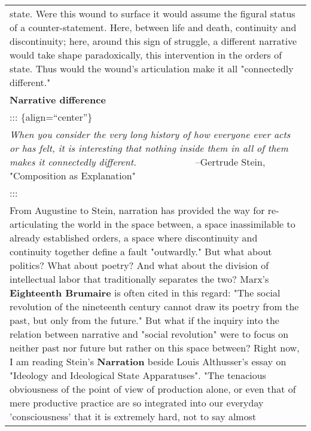 \begin{longtable}[]{@{}l@{}}
\begin{minipage}[t]{0.97\columnwidth}
state. Were this wound to surface it would assume the figural status of
a counter-statement. Here, between life and death, continuity and
discontinuity; here, around this sign of struggle, a different narrative
would take shape paradoxically, this intervention in the orders of
state. Thus would the wound's articulation make it all "connectedly
different."\strut
\end{minipage}\tabularnewline
\begin{minipage}[t]{0.97\columnwidth}\raggedright
\textbf{Narrative difference}\strut
\end{minipage}\tabularnewline
\begin{minipage}[t]{0.97\columnwidth}\raggedright
::: \{align=``center''\}\strut
\end{minipage}\tabularnewline
\begin{minipage}[t]{0.97\columnwidth}\raggedright
\textbar{} \emph{When you consider the very long history of how everyone
ever acts or \textbar{} has \textbar{} felt, it is interesting that
nothing inside them in all of them makes \textbar{} it \textbar{}
connectedly different.} \textbar{} \textbar{} ~~~~~~~~~~ ~--Gertrude
Stein, "Composition as Explanation"\strut
\end{minipage}\tabularnewline
\begin{minipage}[t]{0.97\columnwidth}\raggedright
:::\strut
\end{minipage}\tabularnewline
\begin{minipage}[t]{0.97\columnwidth}\raggedright
From Augustine to Stein, narration has provided the way for
re-articulating the world in the space between, a space inassimilable to
already established orders, a space where discontinuity and continuity
together define a fault "outwardly." But what about politics? What about
poetry? And what about the division of intellectual labor that
traditionally separates the two? Marx's \textbf{Eighteenth Brumaire} is
often cited in this regard: "The social revolution of the nineteenth
century cannot draw its poetry from the past, but only from the future."
But what if the inquiry into the relation between narrative and "social
revolution" were to focus on neither past nor future but rather on this
space between? Right now, I am reading Stein's \textbf{Narration} beside
Louis Althusser's essay on "Ideology and Ideological State Apparatuses".
"The tenacious obviousness of the point of view of production alone, or
even that of mere productive practice are so integrated into our
everyday 'consciousness' that it is extremely hard, not to say almost

\end{minipage}
\end{longtable}
